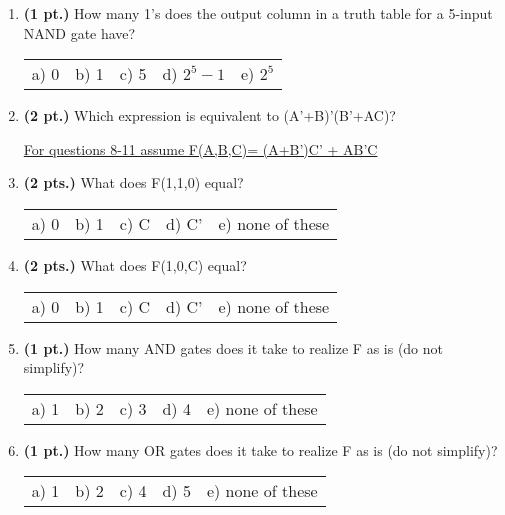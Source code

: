 \documentclass{article}
\begin{document}
\begin{enumerate}
\item {\bf (1 pt.)} How many 1's does the output column in a truth table for a 
5-input NAND gate have?

\begin{tabular}{p{0.7in} p{0.7in} p{0.7in} p{0.7in} l}
a) 0 & b) 1 & c) 5 & d) $2^{5}-1$ & e) $2^5$
\end{tabular}

\item {\bf (2 pt.)} Which expression is equivalent to (A'+B)'(B'+AC)?

\pagebreak

\underline{For questions 8-11 assume F(A,B,C)= (A+B')C' + AB'C}

\item {\bf (2 pts.)} What does F(1,1,0) equal?

\begin{tabular}{p{0.7in} p{0.7in} p{0.7in} p{0.7in} l}
a) 0 & b) 1 & c) C & d) C' & e) none of these
\end{tabular}

\item {\bf (2 pts.)} What does F(1,0,C) equal?

\begin{tabular}{p{0.7in} p{0.7in} p{0.7in} p{0.7in} l}
a) 0 & b) 1 & c) C & d) C' & e) none of these
\end{tabular}

\item {\bf (1 pt.)} How many AND gates does it take to realize F
as is (do not simplify)?

\begin{tabular}{p{0.7in} p{0.7in} p{0.7in} p{0.7in} l}
a) 1 & b) 2 & c) 3 & d) 4 & e) none of these
\end{tabular}

\item {\bf (1 pt.)} How many OR gates does it take to realize F
as is (do not simplify)?

\begin{tabular}{p{0.7in} p{0.7in} p{0.7in} p{0.7in} l}
a) 1 & b) 2 & c) 4 & d) 5 & e) none of these
\end{tabular}


\end{enumerate}
\end{document}
